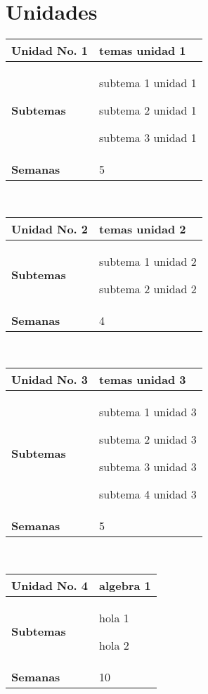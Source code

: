 \documentclass[11pt]{article}
\begin{document}
\section*{Unidades}
\noindent 
\begin{tabular}{R{0.16\textwidth} L{0.7\textwidth}} 
 \\ 
\toprule \textbf{Unidad No. 1} & temas unidad 1 
 \\ 
\midrule\textbf{Subtemas} & 
\begin{description}
 \item subtema 1 unidad 1 \item subtema 2 unidad 1 \item subtema 3 unidad 1 
\end{description}
 \\ 
\textbf{Semanas} & 5 
\end{tabular} 
 \\ 
 \begin{tabular}{R{0.16\textwidth} L{0.7\textwidth}} 
 \\ 
\toprule \textbf{Unidad No. 2} & temas unidad 2 
 \\ 
\midrule\textbf{Subtemas} & 
\begin{description}
 \item subtema 1 unidad 2 \item subtema 2 unidad 2 
\end{description}
 \\ 
\textbf{Semanas} & 4 
\end{tabular} 
 \\ 
 \begin{tabular}{R{0.16\textwidth} L{0.7\textwidth}} 
 \\ 
\toprule \textbf{Unidad No. 3} & temas unidad 3 
 \\ 
\midrule\textbf{Subtemas} & 
\begin{description}
 \item subtema 1 unidad 3 \item subtema 2 unidad 3 \item subtema 3 unidad 3 \item subtema 4 unidad 3 
\end{description}
 \\ 
\textbf{Semanas} & 5 
\end{tabular} 
 \\ 
 \begin{tabular}{R{0.16\textwidth} L{0.7\textwidth}} 
 \\ 
\toprule \textbf{Unidad No. 4} & algebra 1 
 \\ 
\midrule\textbf{Subtemas} & 
\begin{description}
 \item hola 1 \item hola 2 
\end{description}
 \\ 
\textbf{Semanas} & 10 
\end{tabular} 
 \\ 
 
\end{document}
